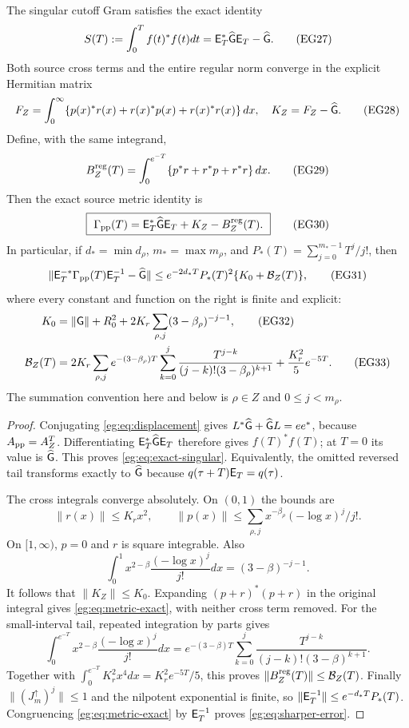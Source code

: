 \begin{egtheorem}
\label{eg:thm:finite-correction}
The singular cutoff Gram satisfies the exact identity
\[
 S(T):=\int_0^T f(t)^*f(t)dt=\mathsf E_T^*\widehat{\mathsf G}\mathsf E_T-\widehat{\mathsf G}.
 \tag{EG27}\label{eg:eq:exact-singular}
\]
Both source cross terms and the entire regular norm converge in the
explicit Hermitian matrix
\[
 F_Z=\int_0^\infty\{p(x)^*r(x)+r(x)^*p(x)+r(x)^*r(x)\}\,dx,
 \quad K_Z=F_Z-\widehat{\mathsf G}.\tag{EG28}\label{eg:eq:finite-K}
\]
Define, with the same integrand,
\[
 B_Z^{\rm reg}(T)=\int_0^{e^{-T}}
                     \{p^*r+r^*p+r^*r\}\,dx.
 \tag{EG29}\label{eg:eq:regular-tail}
\]
Then the exact source metric identity is
\[
 \boxed{\ \Gamma_{\rm pp}(T)=
       \mathsf E_T^*\widehat{\mathsf G}\mathsf E_T+K_Z-B_Z^{\rm reg}(T).\ }
 \tag{EG30}\label{eg:eq:metric-exact}
\]
In particular, if $d_* =\min d_\rho$, $m_* =\max m_\rho$, and
$P_*(T)=\sum_{j=0}^{m_*-1}T^j/j!$, then
\[
 \|\mathsf E_T^{-*}\Gamma_{\rm pp}(T)\mathsf E_T^{-1}-\widehat{\mathsf G}\|
       \le e^{-2d_*T}P_*(T)^2\{K_0+\mathcal B_Z(T)\},
 \tag{EG31}\label{eg:eq:sharper-error}
\]
where every constant and function on the right is finite and explicit:
\begin{align}
 K_0&=\|\mathsf G\|+R_0^2+
                2K_r\sum_{\rho,j}(3-\beta_\rho)^{-j-1},\tag{EG32}\label{eg:eq:K0}\\
 \mathcal B_Z(T)&=2K_r\sum_{\rho,j}e^{-(3-\beta_\rho)T}
   \sum_{k=0}^j\frac{T^{j-k}}{(j-k)!(3-\beta_\rho)^{k+1}}
                       +\frac{K_r^2}5e^{-5T}.\tag{EG33}\label{eg:eq:B-bound}
\end{align}
The summation convention here and below is $\rho\in Z$ and
$0\le j<m_\rho$.
\end{egtheorem}
\begin{proof}
Conjugating \eqref{eg:eq:displacement} gives
$L^*\widehat{\mathsf G}+\widehat{\mathsf G} L=ee^*$, because
$A_{\rm pp}=A_Z^T$. Differentiating
$\mathsf E_T^*\widehat{\mathsf G}\mathsf E_T$ therefore gives $f(T)^*f(T)$; at $T=0$
its value is $\widehat{\mathsf G}$. This proves \eqref{eg:eq:exact-singular}.
Equivalently, the omitted reversed tail transforms exactly to
$\widehat{\mathsf G}$ because $q(\tau+T)\mathsf E_T=q(\tau)$.

The cross integrals converge absolutely. On $(0,1)$ the bounds are
\[
 \|r(x)\|\le K_rx^2,\qquad
 \|p(x)\|\le\sum_{\rho,j}x^{-\beta_\rho}(-\log x)^j/j!.
\]
On $[1,\infty)$, $p=0$ and $r$ is square integrable. Also
\[
 \int_0^1x^{2-\beta}\frac{(-\log x)^j}{j!}dx
                         =(3-\beta)^{-j-1}.
\]
It follows that $\|K_Z\|\le K_0$. Expanding
$(p+r)^*(p+r)$ in the original integral gives
\eqref{eg:eq:metric-exact}, with neither cross term removed.
For the small-interval tail, repeated integration by parts gives
\[
 \int_0^{e^{-T}}x^{2-\beta}\frac{(-\log x)^j}{j!}dx
 =e^{-(3-\beta)T}\sum_{k=0}^j
                    \frac{T^{j-k}}{(j-k)!(3-\beta)^{k+1}}.
\]
Together with $\int_0^{e^{-T}}K_r^2x^4dx=K_r^2e^{-5T}/5$, this
proves $\|B_Z^{\rm reg}(T)\|\le\mathcal B_Z(T)$.
Finally $\|(J_m^\uparrow)^j\|\le1$ and the nilpotent exponential
is finite, so $\|\mathsf E_T^{-1}\|\le e^{-d_*T}P_*(T)$.
Congruencing \eqref{eg:eq:metric-exact} by $\mathsf E_T^{-1}$ proves
\eqref{eg:eq:sharper-error}.
\end{proof}

